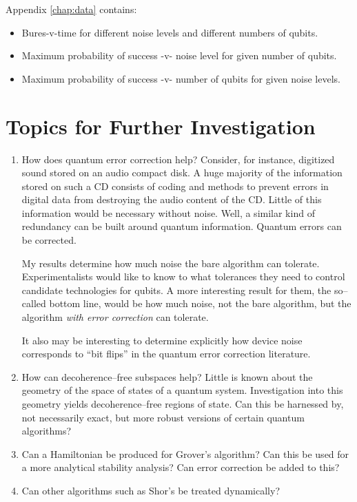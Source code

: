\pagebreak

\noindent
Appendix \ref{chap:data} contains:
\begin{itemize}
\item Bures-v-time for different noise levels and different numbers of qubits.
\item Maximum probability of success -v- noise level for given number of qubits.
\item Maximum probability of success -v- number of qubits for given noise levels.
\end{itemize}


\section{Topics for Further Investigation}

\begin{enumerate}
\item How does quantum error correction help?  
Consider, for instance, digitized sound stored on an audio 
compact disk.
A huge majority of the information stored on such a CD consists of 
coding and methods to prevent errors in
digital data from destroying the audio content of
the CD.
Little of this information would be necessary without noise.
Well, a similar kind of redundancy can be built around quantum information.
Quantum errors can be corrected.

My results determine how much noise the bare algorithm can tolerate.
Experimentalists
would like to know to what tolerances they need to control candidate
technologies for qubits.
A more interesting result for them, the so--called bottom line, would be
how much noise, not the bare algorithm, but the algorithm \emph{with
error correction} can tolerate.

It also may be interesting to determine explicitly how device 
noise corresponds to ``bit flips'' in the quantum error 
correction literature.

\item How can decoherence--free subspaces help?  Little is known about
the geometry of the space of states of a quantum system.  Investigation
into this geometry yields decoherence--free regions of 
state\cite{Kempe/Bacon/Lidar/Whaley:00}.  Can this be harnessed by,
not necessarily exact, but more robust versions of certain quantum
algorithms?

\item Can a Hamiltonian be produced for Grover's algorithm?  Can this
be used for a more analytical stability analysis?  Can error correction
be added to this?

\item Can other algorithms such as Shor's be treated dynamically?
\end{enumerate}
